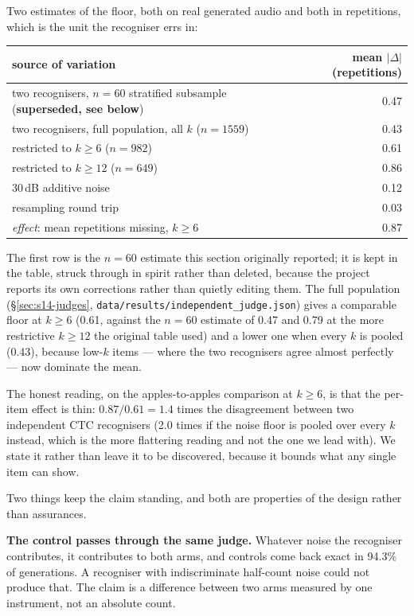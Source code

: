 \documentclass[11pt]{article}
\begin{document}
Two estimates of the floor, both on real generated audio and both in
repetitions, which is the unit the recogniser errs in:

\begin{center}
\begin{tabular}{lr}
\toprule
source of variation & mean $|\Delta|$ (repetitions) \\
\midrule
two recognisers, $n{=}60$ stratified subsample (\textbf{superseded, see below}) & 0.47 \\
two recognisers, full population, all $k$ ($n{=}1559$) & 0.43 \\
\quad restricted to $k\ge6$ ($n{=}982$) & 0.61 \\
\quad restricted to $k\ge12$ ($n{=}649$) & 0.86 \\
30\,dB additive noise & 0.12 \\
resampling round trip & 0.03 \\
\midrule
\emph{effect}: mean repetitions missing, $k\ge6$ & 0.87 \\
\bottomrule
\end{tabular}
\end{center}

The first row is the $n{=}60$ estimate this section originally reported; it is
kept in the table, struck through in spirit rather than deleted, because the
project reports its own corrections rather than quietly editing them. The full
population (\S\ref{sec:s14-judges}, \texttt{data/results/independent\_judge.json})
gives a comparable floor at $k\ge6$ (0.61, against the $n{=}60$ estimate of 0.47
and 0.79 at the more restrictive $k\ge12$ the original table used) and a lower
one when every $k$ is pooled (0.43), because low-$k$ items --- where the two
recognisers agree almost perfectly --- now dominate the mean.

The honest reading, on the apples-to-apples comparison at $k\ge6$, is that the
per-item effect is thin: $0.87/0.61 = 1.4$ times the disagreement between two
independent CTC recognisers (2.0 times if the noise floor is pooled over every
$k$ instead, which is the more flattering reading and not the one we lead
with). We state it rather than leave it to be discovered, because it bounds
what any single item can show.

Two things keep the claim standing, and both are properties of the design rather
than assurances.

\noindent\textbf{The control passes through the same judge.} Whatever noise the
recogniser contributes, it contributes to both arms, and controls come back
exact in 94.3\% of generations. A recogniser with indiscriminate
half-count noise could not produce that. The claim is a difference between two
arms measured by one instrument, not an absolute count.
\end{document}
